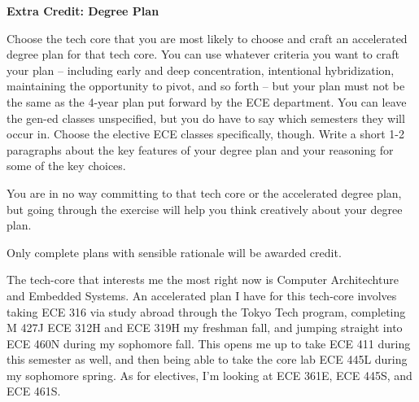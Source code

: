 \documentclass[11pt]{article}
\begin{document}
\begin{problem}

\textbf{Extra Credit: Degree Plan}

Choose the tech core that you are most likely to choose and craft an accelerated degree plan for that
tech core. You can use whatever criteria you want to craft your plan – including early and deep
concentration, intentional hybridization, maintaining the opportunity to pivot, and so forth – but your
plan must not be the same as the 4-year plan put forward by the ECE department. You can leave the
gen-ed classes unspecified, but you do have to say which semesters they will occur in. Choose the
elective ECE classes specifically, though. Write a short 1-2 paragraphs about the key features of your
degree plan and your reasoning for some of the key choices.

You are in no way committing to that tech core or the accelerated degree plan, but going through the
exercise will help you think creatively about your degree plan.

Only complete plans with sensible rationale will be awarded credit.

\end{problem}

\pagebreak

\begin{soln}
\end{soln}

The tech-core that interests me the most right now is Computer Architechture
and Embedded Systems. An accelerated plan I have for this tech-core involves
taking ECE 316 via study abroad through the Tokyo Tech program, completing
M 427J ECE 312H and ECE 319H my freshman fall, and jumping straight into
ECE 460N during my sophomore fall. This opens me up to take ECE 411 during
this semester as well, and then being able to take the core lab ECE 445L
during my sophomore spring. As for electives, I'm looking at ECE 361E,
ECE 445S, and ECE 461S.
\end{document}
